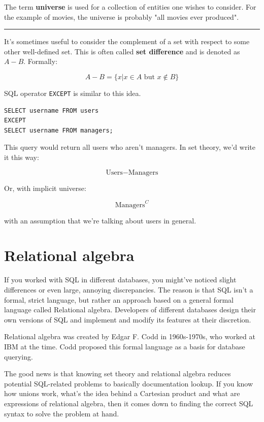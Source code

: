 \documentclass[12pt, a4paper, justified, notitlepage, sfsidenotes, notoc]{book}
\begin{document}
The term \textbf{universe} is used for a collection of entities one wishes to consider. For the example of movies, the universe is probably "all movies ever produced".

\noindent\rule{\textwidth}{0.5pt}

It's sometimes useful to consider the complement of a set with respect to some other well-defined set. This is often called \textbf{set difference} and is denoted as \(A - B\). Formally:

\begin{equation}
A - B = \{x | x \in A \textrm{ but } x \notin B\}
\end{equation}

SQL operator \texttt{EXCEPT} is similar to this idea.

\begin{verbatim}
SELECT username FROM users
EXCEPT
SELECT username FROM managers;
\end{verbatim}

This query would return all users who aren't managers. In set theory, we'd write it this way:

\begin{equation}
\textrm{Users} - \textrm{Managers}
\end{equation}

Or, with implicit universe:

\begin{equation}
\textrm{Managers}^{C}
\end{equation}

with an assumption that we're talking about users in general.

\section{Relational algebra}
\label{sec:orgee6c250}

If you worked with SQL in different databases, you might've noticed slight differences or even large, annoying discrepancies. The reason is that SQL isn't a formal, strict language, but rather an approach based on a general formal language called Relational algebra. Developers of different databases design their own versions of SQL and implement and modify its features at their discretion.

Relational algebra was created by Edgar F. Codd in 1960s-1970s, who worked at IBM at the time. Codd proposed this formal language as a basis for database querying.

The good news is that knowing set theory and relational algebra reduces potential SQL-related problems to basically documentation lookup. If you know how unions work, what's the idea behind a Cartesian product and what are expressions of relational algebra, then it comes down to finding the correct SQL syntax to solve the problem at hand.
\end{document}
